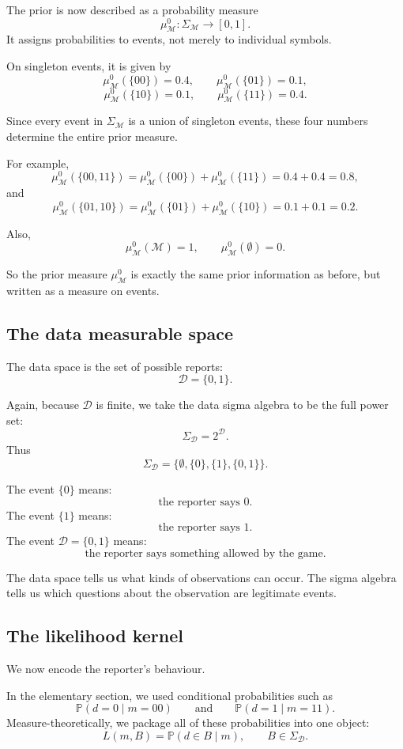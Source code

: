 \documentclass[11pt]{article}
\newcommand{\M}{\mathcal{M}}
\newcommand{\D}{\mathcal{D}}
\newcommand{\SigmaM}{\Sigma_{\M}}
\newcommand{\SigmaD}{\Sigma_{\D}}
\newcommand{\muMzero}{\mu^0_{\M}}
\begin{document}
The prior is now described as a probability measure
\[
    \muMzero:\SigmaM\to[0,1].
\]
It assigns probabilities to events, not merely to individual symbols.

On singleton events, it is given by
\[
    \muMzero(\{00\})=0.4,
    \qquad
    \muMzero(\{01\})=0.1,
\]
\[
    \muMzero(\{10\})=0.1,
    \qquad
    \muMzero(\{11\})=0.4.
\]

Since every event in \(\SigmaM\) is a union of singleton events, these four numbers determine the entire prior measure.

For example,
\[
    \muMzero(\{00,11\})
    =
    \muMzero(\{00\})+\muMzero(\{11\})
    =
    0.4+0.4
    =
    0.8,
\]
and
\[
    \muMzero(\{01,10\})
    =
    \muMzero(\{01\})+\muMzero(\{10\})
    =
    0.1+0.1
    =
    0.2.
\]

Also,
\[
    \muMzero(\M)=1,
    \qquad
    \muMzero(\emptyset)=0.
\]

So the prior measure \(\muMzero\) is exactly the same prior information as before, but written as a measure on events.

\subsection{The data measurable space}

The data space is the set of possible reports:
\[
    \D=\{0,1\}.
\]

Again, because \(\D\) is finite, we take the data sigma algebra to be the full power set:
\[
    \SigmaD = 2^{\D}.
\]
Thus
\[
    \SigmaD
    =
    \{\emptyset,\{0\},\{1\},\{0,1\}\}.
\]

The event \(\{0\}\) means:
\[
    \text{the reporter says }0.
\]
The event \(\{1\}\) means:
\[
    \text{the reporter says }1.
\]
The event \(\D=\{0,1\}\) means:
\[
    \text{the reporter says something allowed by the game}.
\]

The data space tells us what kinds of observations can occur. The sigma algebra tells us which questions about the observation are legitimate events.

\subsection{The likelihood kernel}

We now encode the reporter's behaviour.

In the elementary section, we used conditional probabilities such as
\[
    \mathbb{P}(d=0\mid m=00)
    \qquad
    \text{and}
    \qquad
    \mathbb{P}(d=1\mid m=11).
\]
Measure-theoretically, we package all of these probabilities into one object:
\[
    L(m,B)
    =
    \mathbb{P}(d\in B\mid m),
    \qquad
    B\in\SigmaD.
\]
\end{document}
